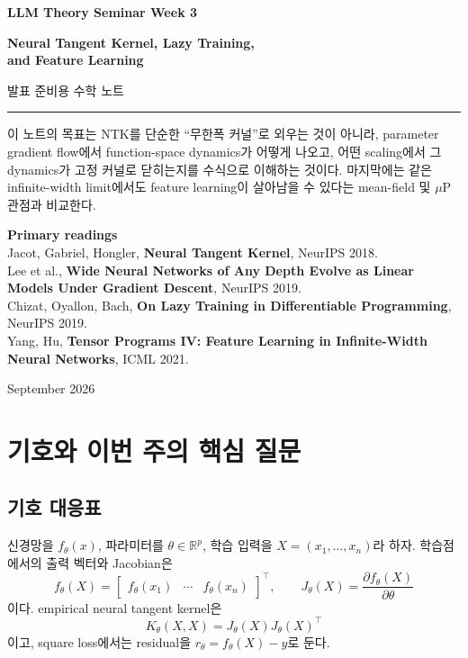 \documentclass[11pt,a4paper,oneside,openany]{memoir}
\newcommand{\R}{\mathbb{R}}
\theoremstyle{definition}
\begin{document}
\begin{titlingpage}
\thispagestyle{empty}
\vspace*{1.2cm}
{\small\bfseries LLM Theory Seminar \hfill Week 3\par}
\vspace{1.4cm}
{\HUGE\bfseries Neural Tangent Kernel, Lazy Training,\\[0.18em]and Feature Learning\par}
\vspace{0.55cm}
{\large 발표 준비용 수학 노트\par}
\vspace{0.9cm}
\rule{\textwidth}{0.7pt}
\vspace{1.1cm}
\begin{minipage}{0.86\textwidth}
\small
이 노트의 목표는 NTK를 단순한 ``무한폭 커널''로 외우는 것이 아니라, parameter gradient flow에서 function-space dynamics가 어떻게 나오고, 어떤 scaling에서 그 dynamics가 고정 커널로 닫히는지를 수식으로 이해하는 것이다. 마지막에는 같은 infinite-width limit에서도 feature learning이 살아남을 수 있다는 mean-field 및 $\mu$P 관점과 비교한다.
\end{minipage}
\vfill
{\small\textbf{Primary readings}\\[0.25em]
Jacot, Gabriel, Hongler, \textbf{Neural Tangent Kernel}, NeurIPS 2018.\\
Lee et al., \textbf{Wide Neural Networks of Any Depth Evolve as Linear Models Under Gradient Descent}, NeurIPS 2019.\\
Chizat, Oyallon, Bach, \textbf{On Lazy Training in Differentiable Programming}, NeurIPS 2019.\\
Yang, Hu, \textbf{Tensor Programs IV: Feature Learning in Infinite-Width Neural Networks}, ICML 2021.
\par}
\vspace{0.8cm}
{\small September 2026\par}
\end{titlingpage}
\tableofcontents*
\clearpage

\chapter{기호와 이번 주의 핵심 질문}
\section{기호 대응표}
신경망을 $f_\theta(x)$, 파라미터를 $\theta\in\R^p$, 학습 입력을 $X=(x_1,\ldots,x_n)$라 하자. 학습점에서의 출력 벡터와 Jacobian은
\[
f_\theta(X)=\begin{bmatrix}f_\theta(x_1)&\cdots&f_\theta(x_n)\end{bmatrix}^\top,
\qquad
J_\theta(X)=\frac{\partial f_\theta(X)}{\partial \theta}
\]
이다. empirical neural tangent kernel은
\[
K_\theta(X,X)=J_\theta(X)J_\theta(X)^\top
\]
이고, square loss에서는 residual을 $r_\theta=f_\theta(X)-y$로 둔다.
\end{document}
